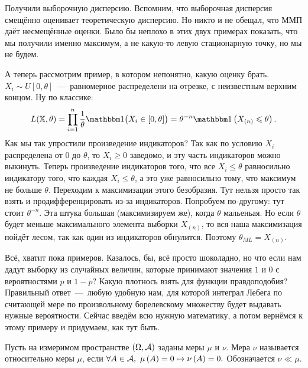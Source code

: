 \documentclass[../TV&MS.tex]{subfiles}
\begin{document}
Получили выборочную дисперсию. 
Вспомним, что выборочная дисперсия смещённо оценивает теоретическую дисперсию.
Но никто и не обещал, что ММП даёт несмещённые оценки. 
Было бы неплохо в этих двух примерах показать, что мы получили именно максимум, а не какую-то левую стационарную точку, но мы не будем.

\begin{Ex}
    А теперь рассмотрим пример, в котором непонятно, какую оценку брать.
    $X_i \sim U[0, \theta]$~---~равномерное распределени на отрезке, с неизвестным верхним концом.
    Ну по классике:
    \begin{equation}
            L(\Smpl, \theta) =
            \prod\limits_{i=1}^{n} \frac{1}{\theta} \Ind\bigl(X_i \in \left[ 0, \theta \right]\bigr) =
            \theta^{-n}\Ind\left( X_{(n)} \le \theta \right).
    \end{equation} 
    Как мы так упростили произведение индикаторов?
    Так как по условию $X_i$ распределена от $0$ до $\theta$,
    то $X_i \ge 0$ заведомо, и эту часть индикаторов можно выкинуть.
    Теперь произведение индикаторов того, что все $X_i \le \theta$
    равносильно индикатору того, что каждая $X_i \le \theta$,
    а это уже равносильно тому, что максимум не больше $\theta$.
    Переходим к максимизации этого безобразия.
    Тут нельзя просто так взять и продифференцировать из-за индикаторов.
    Попробуем по-другому: тут стоит $\theta^{-n}$. 
    Эта штука большая (максимизируем же), когда $\theta$ мальеньая.
    Но если  $\theta$ будет меньше максимального элемента выборки $X_{(n)}$,
    то вся наша максимизация пойдёт лесом, так как один из индикаторов обнулится.
    Поэтому $\theta_{ML} = X_{(n)}$.
\end{Ex}

Всё, хватит пока примеров. Казалось, бы, всё просто шоколадно,
но что если нам дадут выборку из случайных величин, которые принимают
значения $1$ и $0$ с вероятностями $p$ и $1-p$?
Какую плотнось взять для функции правдоподобия?
Правильный ответ~---~любую удобную нам, для которой интеграл Лебега по считающей мере
по произвольному борелевскому множеству будет выдавать нужные вероятности.
Сейчас введём всю нужную математику, а потом вернёмся к этому примеру и придумаем, как тут быть.

\begin{Def}
    Пусть на измеримом пространстве $\left( \Omega, \mathcal{A} \right)$ заданы меры $\mu$ и $\nu$.
    Мера  $\nu$ называется  относительно меры $\mu$, если
    $\forall A \in \mathcal{A},\ \mu\left( A \right) = 0 \mapsto \nu\left( A \right) = 0.$
    Обозначается $\nu \ll \mu$.
\end{Def} 
\end{document}
